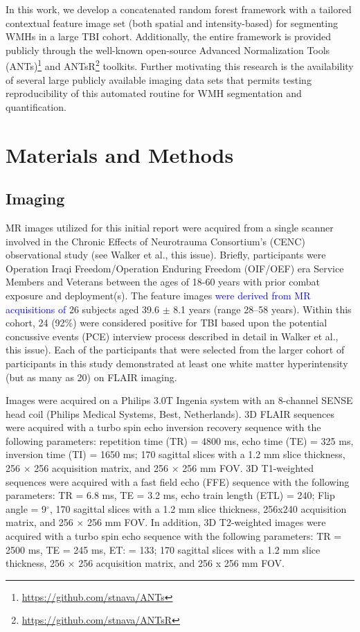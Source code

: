 \documentclass[11pt,]{article}
\let\rmarkdownfootnote\footnote%
\def\footnote{\protect\rmarkdownfootnote}
\begin{document}
In this work, we develop a concatenated random forest framework with a
tailored contextual feature image set (both spatial and intensity-based)
for segmenting WMHs in a large TBI cohort. Additionally, the entire
framework is provided publicly through the well-known open-source
Advanced Normalization Tools (ANTs)\footnote{\url{https://github.com/stnava/ANTs}}
and ANTsR\footnote{\url{https://github.com/stnava/ANTsR}} toolkits.
Further motivating this research is the availability of several large
publicly available imaging data sets that permits testing
reproducibility of this automated routine for WMH segmentation and
quantification.

\section{Materials and Methods}\label{materials-and-methods}

\subsection{Imaging}\label{imaging}

MR images utilized for this initial report were acquired from a single
scanner involved in the Chronic Effects of Neurotrauma Consortium's
(CENC) observational study (see Walker et al., this issue). Briefly,
participants were Operation Iraqi Freedom/Operation Enduring Freedom
(OIF/OEF) era Service Members and Veterans between the ages of 18-60
years with prior combat exposure and deployment(s). The feature images
\textcolor{blue}{were derived from MR acquisitions of} 26 subjects aged
39.6 \(\pm\) 8.1 years (range 28--58 years). Within this cohort, 24
(92\%) were considered positive for TBI based upon the potential
concussive events (PCE) interview process described in detail in Walker
et al., this issue). Each of the participants that were selected from
the larger cohort of participants in this study demonstrated at least
one white matter hyperintensity (but as many as 20) on FLAIR imaging.

Images were acquired on a Philips 3.0T Ingenia system with an 8-channel
SENSE head coil (Philips Medical Systems, Best, Netherlands). 3D FLAIR
sequences were acquired with a turbo spin echo inversion recovery
sequence with the following parameters: repetition time (TR) = 4800 ms,
echo time (TE) = 325 ms, inversion time (TI) = 1650 ms; 170 sagittal
slices with a 1.2 mm slice thickness, 256 \(\times\) 256 acquisition
matrix, and 256 \(\times\) 256 mm FOV. 3D T1-weighted sequences were
acquired with a fast field echo (FFE) sequence with the following
parameters: TR = 6.8 ms, TE = 3.2 ms, echo train length (ETL) = 240;
Flip angle = 9\(^\circ\), 170 sagittal slices with a 1.2 mm slice
thickness, 256x240 acquisition matrix, and 256 \(\times\) 256 mm FOV. In
addition, 3D T2-weighted images were acquired with a turbo spin echo
sequence with the following parameters: TR = 2500 ms, TE = 245 ms, ET: =
133; 170 sagittal slices with a 1.2 mm slice thickness, 256 \(\times\)
256 acquisition matrix, and 256 x 256 mm FOV.
\end{document}
